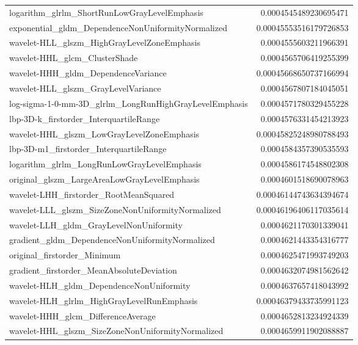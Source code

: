 {\begin{xltabular}[H]{\textwidth}{X r}
        logarithm\_glrlm\_ShortRunLowGrayLevelEmphasis & 0.0004545489230695471 \\
        exponential\_gldm\_DependenceNonUniformityNormalized & 0.00045553516179726853 \\
        wavelet-HLL\_glszm\_HighGrayLevelZoneEmphasis & 0.0004555603211966391 \\
        wavelet-HHL\_glcm\_ClusterShade & 0.0004565706419255399 \\
        wavelet-HHH\_gldm\_DependenceVariance & 0.00045668650737166994 \\
        wavelet-HLL\_glszm\_GrayLevelVariance & 0.0004567807184045051 \\
        log-sigma-1-0-mm-3D\_glrlm\_LongRunHighGrayLevelEmphasis & 0.0004571780329455228 \\
        lbp-3D-k\_firstorder\_InterquartileRange & 0.0004576331454213923 \\
        wavelet-HHL\_glszm\_LowGrayLevelZoneEmphasis & 0.00045825248980788493 \\
        lbp-3D-m1\_firstorder\_InterquartileRange & 0.0004584357390535593 \\
        logarithm\_glrlm\_LongRunLowGrayLevelEmphasis & 0.0004586174548802308 \\
        original\_glszm\_LargeAreaLowGrayLevelEmphasis & 0.0004601518690078963 \\
        wavelet-LHH\_firstorder\_RootMeanSquared & 0.00046144743634394674 \\
        wavelet-LLL\_glszm\_SizeZoneNonUniformityNormalized & 0.00046196406117035614 \\
        wavelet-LLH\_gldm\_GrayLevelNonUniformity & 0.0004621170301339041 \\
        gradient\_gldm\_DependenceNonUniformityNormalized & 0.0004621443354316777 \\
        original\_firstorder\_Minimum & 0.0004625471993749203 \\
        gradient\_firstorder\_MeanAbsoluteDeviation & 0.0004632074981562642 \\
        wavelet-HLH\_gldm\_DependenceNonUniformity & 0.0004637657418043992 \\
        wavelet-HLH\_glrlm\_HighGrayLevelRunEmphasis & 0.00046379433735991123 \\
        wavelet-HHH\_glcm\_DifferenceAverage & 0.0004652813234924339 \\
        wavelet-HHL\_glszm\_SizeZoneNonUniformityNormalized & 0.0004659911902088887 \\

\end{xltabular}}
